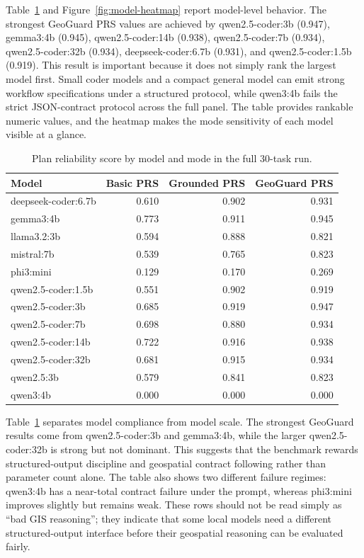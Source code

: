 \documentclass[12pt]{gsis}  %
\begin{document}
Table~\ref{tab:model-summary} and Figure~\ref{fig:model-heatmap} report model-level behavior. The strongest GeoGuard PRS values are achieved by qwen2.5-coder:3b (0.947), gemma3:4b (0.945), qwen2.5-coder:14b (0.938), qwen2.5-coder:7b (0.934), qwen2.5-coder:32b (0.934), deepseek-coder:6.7b (0.931), and qwen2.5-coder:1.5b (0.919). This result is important because it does not simply rank the largest model first. Small coder models and a compact general model can emit strong workflow specifications under a structured protocol, while qwen3:4b fails the strict JSON-contract protocol across the full panel. The table provides rankable numeric values, and the heatmap makes the mode sensitivity of each model visible at a glance.

\begin{table}[htbp]
\centering
\caption{Plan reliability score by model and mode in the full 30-task run.}
\label{tab:model-summary}
\small
\setlength{\tabcolsep}{4pt}
\begin{tabular}{lrrr}
\toprule
Model & Basic PRS & Grounded PRS & GeoGuard PRS \\
\midrule
deepseek-coder:6.7b & 0.610 & 0.902 & 0.931 \\
gemma3:4b & 0.773 & 0.911 & 0.945 \\
llama3.2:3b & 0.594 & 0.888 & 0.821 \\
mistral:7b & 0.539 & 0.765 & 0.823 \\
phi3:mini & 0.129 & 0.170 & 0.269 \\
qwen2.5-coder:1.5b & 0.551 & 0.902 & 0.919 \\
qwen2.5-coder:3b & 0.685 & 0.919 & 0.947 \\
qwen2.5-coder:7b & 0.698 & 0.880 & 0.934 \\
qwen2.5-coder:14b & 0.722 & 0.916 & 0.938 \\
qwen2.5-coder:32b & 0.681 & 0.915 & 0.934 \\
qwen2.5:3b & 0.579 & 0.841 & 0.823 \\
qwen3:4b & 0.000 & 0.000 & 0.000 \\
\bottomrule
\end{tabular}
\end{table}

Table~\ref{tab:model-summary} separates model compliance from model scale. The strongest GeoGuard results come from qwen2.5-coder:3b and gemma3:4b, while the larger qwen2.5-coder:32b is strong but not dominant. This suggests that the benchmark rewards structured-output discipline and geospatial contract following rather than parameter count alone. The table also shows two different failure regimes: qwen3:4b has a near-total contract failure under the prompt, whereas phi3:mini improves slightly but remains weak. These rows should not be read simply as ``bad GIS reasoning''; they indicate that some local models need a different structured-output interface before their geospatial reasoning can be evaluated fairly.
\end{document}
